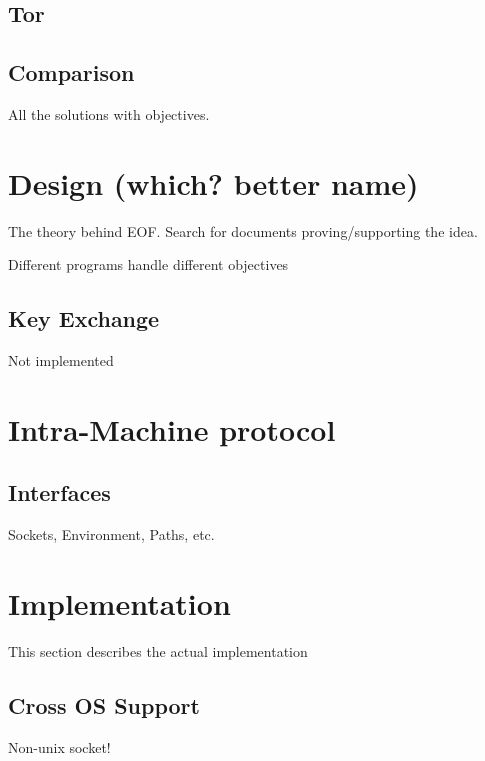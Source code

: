 \documentclass[12pt,a4paper]{article}
\begin{document}
\subsection{Tor}
\subsection{Comparison}
All the solutions with objectives.

\section{Design (which? better name)}
The theory behind EOF.
Search for documents proving/supporting the idea.

Different programs handle different objectives
\subsection{Key Exchange}
Not implemented
\section{Intra-Machine protocol}
\subsection{Interfaces}
Sockets, Environment, Paths, etc.

\section{Implementation}
This section describes the actual implementation
\subsection{Cross OS Support}
Non-unix socket!



\end{document}
